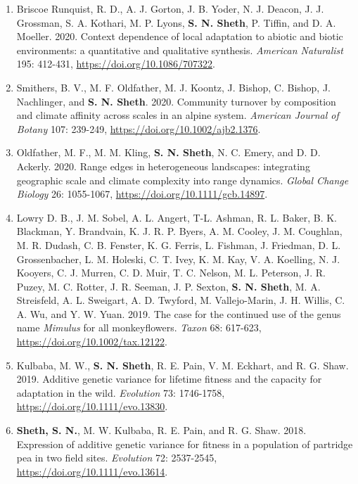 \documentclass[11pt,english]{article}\usepackage[]{graphicx}\usepackage[]{xcolor}
\begin{document}
\begin{hangparas}{.5in}{1}
\begin{enumerate}
\item Briscoe Runquist, R. D., A. J. Gorton, J. B. Yoder, N. J. Deacon, J. J. Grossman, S. A. Kothari, M. P. Lyons, \textbf{S. N. Sheth}, P. Tiffin, and D. A. Moeller. 2020. Context dependence of local adaptation to abiotic and biotic environments: a quantitative and qualitative synthesis. \emph{American Naturalist} 195: 412-431, \url{https://doi.org/10.1086/707322}.

\item Smithers, B. V., M. F. Oldfather, M. J. Koontz, J. Bishop, C. Bishop, J. Nachlinger, and \textbf{S. N. Sheth}. 2020. Community turnover by composition and climate affinity across scales in an alpine system. \emph{American Journal of Botany} 107: 239-249, \url{https://doi.org/10.1002/ajb2.1376}.

\item Oldfather, M. F., M. M. Kling, \textbf{S. N. Sheth}, N. C. Emery, and D. D. Ackerly. 2020. Range edges in heterogeneous landscapes: integrating geographic scale and climate complexity into range dynamics. \emph{Global Change Biology} 26: 1055-1067, \url{https://doi.org/10.1111/gcb.14897}. 

\item Lowry D. B., J. M. Sobel, A. L. Angert, T-L. Ashman, R. L. Baker, B. K. Blackman, Y. Brandvain, K. J. R. P. Byers, A. M. Cooley, J. M. Coughlan, M. R. Dudash, C. B. Fenster, K. G. Ferris, L. Fishman, J. Friedman, D. L. Grossenbacher, L. M. Holeski, C. T. Ivey, K. M. Kay, V. A. Koelling, N. J. Kooyers, C. J. Murren, C. D. Muir, T. C. Nelson, M. L. Peterson, J. R. Puzey, M. C. Rotter, J. R. Seeman, J. P. Sexton, \textbf{S. N. Sheth}, M. A. Streisfeld, A. L. Sweigart, A. D. Twyford, M. Vallejo-Marin, J. H. Willis, C. A. Wu, and Y. W. Yuan. 2019. The case for the continued use of the genus name \textit{Mimulus} for all monkeyflowers. \emph{Taxon} 68: 617-623, \url{https://doi.org/10.1002/tax.12122}. 

\item Kulbaba, M. W., \textbf{S. N. Sheth}, R. E. Pain, V. M. Eckhart, and R. G. Shaw. 2019. Additive genetic variance for lifetime fitness and the capacity for adaptation in the wild. \emph{Evolution} 73: 1746-1758, \url{https://doi.org/10.1111/evo.13830}. 

\item \textbf{Sheth, S. N.}, M. W. Kulbaba, R. E. Pain, and R. G. Shaw. 2018. Expression of additive genetic variance for fitness in a population of partridge pea in two field sites. \emph{Evolution} 72: 2537-2545, \url{https://doi.org/10.1111/evo.13614}. 


\end{enumerate}
\end{hangparas}
\end{document}
